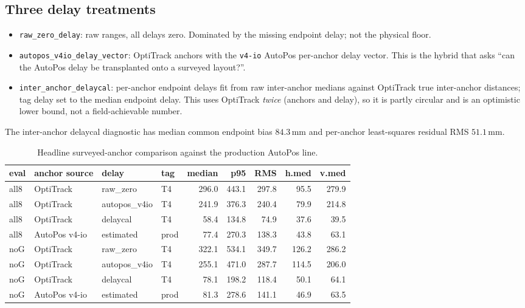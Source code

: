 \documentclass[11pt,a4paper]{article}
\newcommand{\mm}{\,\si{\milli\meter}}
\begin{document}
\subsection{Three delay treatments}
\begin{itemize}[leftmargin=1.4em]
  \item \texttt{raw\_zero\_delay}: raw ranges, all delays zero. Dominated by the missing
        endpoint delay; not the physical floor.
  \item \texttt{autopos\_v4io\_delay\_vector}: OptiTrack anchors with the \texttt{v4-io}
        AutoPos per-anchor delay vector. This is the hybrid that asks ``can the AutoPos delay
        be transplanted onto a surveyed layout?''.
  \item \texttt{inter\_anchor\_delaycal}: per-anchor endpoint delays fit from raw inter-anchor
        medians against OptiTrack true inter-anchor distances; tag delay set to the median
        endpoint delay. This uses OptiTrack \emph{twice} (anchors and delay), so it is partly
        circular and is an optimistic lower bound, not a field-achievable number.
\end{itemize}
The inter-anchor delaycal diagnostic has median common endpoint bias $84.3\mm$ and
per-anchor least-squares residual RMS $51.1\mm$.

\begin{table}[h]
\centering
\caption{Headline surveyed-anchor comparison against the production AutoPos line.}
\small
\begin{tabular}{llllrrrrr}
\toprule
eval & anchor source & delay & tag & median & p95 & RMS & h.med & v.med \\
\midrule
all8 & OptiTrack & raw\_zero      & T4 & 296.0 & 443.1 & 297.8 & 95.5 & 279.9 \\
all8 & OptiTrack & autopos\_v4io  & T4 & 241.9 & 376.3 & 240.4 & 79.9 & 214.8 \\
all8 & OptiTrack & delaycal       & T4 & 58.4  & 134.8 & 74.9  & 37.6 & 39.5 \\
all8 & AutoPos v4-io & estimated  & prod & 77.4 & 270.3 & 138.3 & 43.8 & 63.1 \\
\midrule
noG  & OptiTrack & raw\_zero      & T4 & 322.1 & 534.1 & 349.7 & 126.2 & 286.2 \\
noG  & OptiTrack & autopos\_v4io  & T4 & 255.1 & 471.0 & 287.7 & 114.5 & 206.0 \\
noG  & OptiTrack & delaycal       & T4 & 78.1  & 198.2 & 118.4 & 50.1  & 64.1 \\
noG  & AutoPos v4-io & estimated  & prod & 81.3 & 278.6 & 141.1 & 46.9 & 63.5 \\
\bottomrule
\end{tabular}
\end{table}
\end{document}

